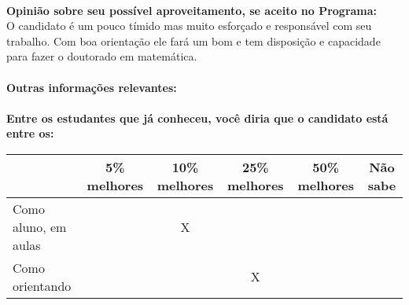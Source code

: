 \documentclass[11pt]{article}
\begin{document}
\\
\textbf{Opinião sobre seu possível aproveitamento, se aceito no Programa:}
\\O candidato é um pouco tímido mas muito esforçado e responsável com seu trabalho. Com boa orientação ele fará um bom e  tem disposição e capacidade para fazer o doutorado em matemática.\\ 
\\
\textbf{Outras informações relevantes:} \\
\\[0.3cm]
\textbf{Entre os estudantes que já conheceu, você diria que o candidato está entre os:}
\\
\begin{tabular}{|l|c|c|c|c|c|}
\hline
 & 5\% melhores & 10\% melhores & 25\% melhores & 50\% melhores & Não sabe \\
\hline
Como aluno, em aulas &  & X &  &  & \\
\hline
Como orientando &  &  & X &  & \\
\hline
\end{tabular}
\end{document}
